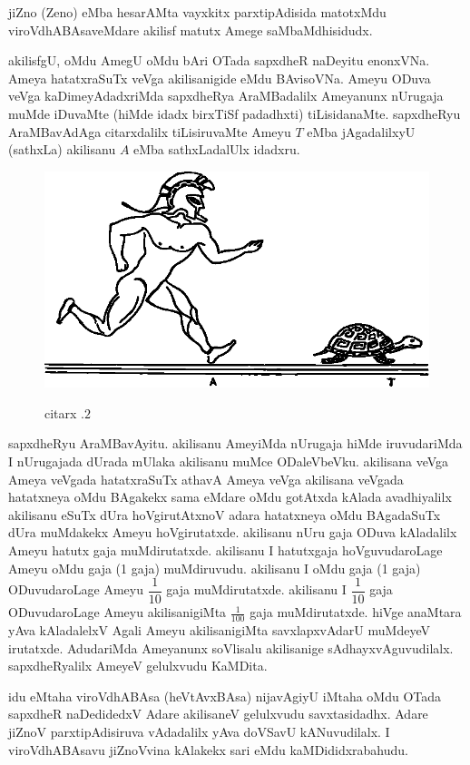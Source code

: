 jiZno {\rm (Zeno)} eMba hesarAMta vayxkitx parxtipAdisida matotxMdu viroVdhABAsa\-veMdare akilisf matutx Amege saMbaMdhisidudx.

akilisfgU, oMdu AmegU oMdu bAri OTada sapxdheR naDeyitu enonxVNa. Ameya hatatxraSuTx veVga akilisanigide eMdu BAvisoVNa. Ameyu ODuva veVga kaDimeyAdadxriMda sapxdheRya AraMBadalilx Ameyanunx nUrugaja muMde iDuvaMte (hiMde idadx birxTiSf padadhxti) tiLisidanaMte. sapxdheRyu AraMBavAdAga citarxdalilx tiLisiruvaMte Ameyu $T$ eMba jAgadalilxyU (sathxLa) akilisanu $A$ eMba sathxLadalUlx idadxru. 
\begin{figure}[H]
\centering
\includegraphics[scale=.65]{src/figures/m_085.eps}\\[-0.3cm]
\caption*{citarx .$2$}
\end{figure}


sapxdheRyu AraMBavAyitu. akilisanu AmeyiMda nUrugaja hiMde iruvuda\-riMda I nUrugajada dUrada mUlaka akilisanu muMce ODaleVbeVku. akilisana veVga Ameya veVgada hatatxraSuTx athavA Ameya veVga akilisana veVgada hatatxneya oMdu BAgakekx sama eMdare oMdu gotAtxda kAlada avadhiyalilx akilisanu eSuTx dUra hoVgirutAtxnoV adara hatatxneya oMdu BAgadaSuTx dUra muMdakekx Ameyu hoVgirutatxde. akilisanu nUru gaja ODuva kAladalilx Ameyu hatutx gaja muMdirutatxde. akilisanu I hatutxgaja hoVguvudaroLage Ameyu oMdu gaja ({\rm 1} gaja) muMdiruvudu. akilisanu I oMdu gaja ({\rm 1} gaja) ODuvudaroLage Ameyu $\dfrac{1}{10}$ gaja muMdirutatxde. akilisanu I $\dfrac{1}{10}$ gaja ODuvudaroLage Ameyu akilisanigiMta $\frac{1}{100}$ gaja muMdirutatxde. hiVge anaMtara yAva kAladalelxV Agali Ameyu akilisanigiMta savxlapxvAdarU muMdeyeV irutatxde. AdudariMda Ameyanunx soVlisalu akilisanige sAdhayxvAguvudilalx. sapxdheRyalilx AmeyeV gelulxvudu KaMDita.

idu eMtaha viroVdhABAsa (heVtAvxBAsa) nijavAgiyU iMtaha oMdu OTada sapxdheR naDedidedxV Adare akilisaneV gelulxvudu savxtasidadhx. Adare jiZnoV parxtipAdisiruva vAdadalilx yAva doVSavU kANuvudilalx. I viroVdhABAsavu  jiZnoVvina kAlakekx sari eMdu kaMDididxrabahudu.


